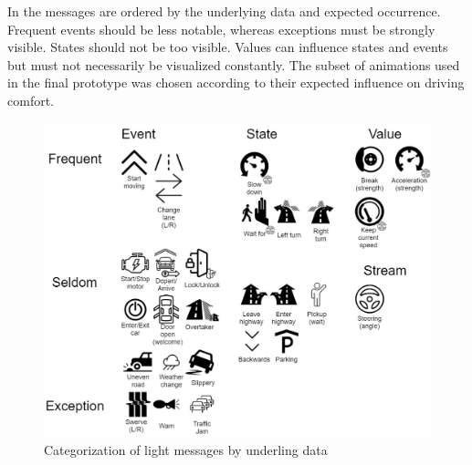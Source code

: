  In \emph{\emph{}} the messages are ordered by the underlying data and expected occurrence. Frequent events should be less notable, whereas exceptions must be strongly visible. States should not be too visible. Values can influence states and events but must not necessarily be visualized constantly. The subset of animations used in the final prototype was chosen according to their expected influence on driving comfort. 
 
\begin{figure}
    \includegraphics[height=0.6\textwidth]{fig/tab-}
    \caption[Light Events]{Categorization of light messages by underling data}
    \label{fig:lightevents}
\end{figure}

